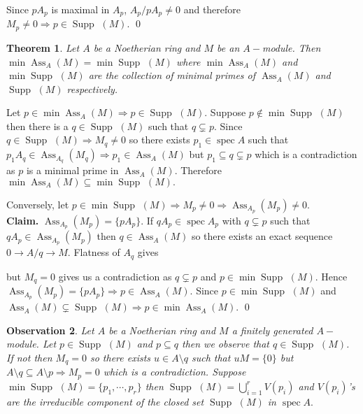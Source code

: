 \documentclass[11pt]{amsart}
\newtheorem{theorem}{Theorem}[section]
\newtheorem{obs}[theorem]{Observation}
\newcommand\isom{\mathrel{\stackon[-0.1ex]{\makebox*{\scalebox{1.08}{\AC}}{=\hfill\llap{=}}}{{\AC}}}}
\newcommand\nvisom{\rotatebox[origin=cc] {-90}{$ \isom $}}
\DeclareMathOperator{\ass}{\text{Ass}}
\DeclareMathOperator{\supp}{\text{Supp~}}
\DeclareMathOperator{\spec}{\text{spec}}
\begin{document}
Since $pA_p$ is maximal in $A_p$, $A_p/pA_p\neq 0$ and therefore $M_p\neq 0 \Rightarrow p\in\supp(M).$ \qed

\begin{theorem}

Let $A$ be a Noetherian ring and $M$ be an $A-$module. Then $\min \ass_A(M)=\min \supp(M)$ where $\min \ass_A(M)$ and $\min\supp(M)$ are the collection of minimal primes of $\ass_A(M)$ and $\supp(M)$ respectively.

\end{theorem}

\proof Let $p\in\min \ass_A(M) \Rightarrow p\in\supp(M).$ Suppose $p\notin \min\supp(M)$ then there is a $q\in \supp(M)$ such that $q\subsetneq p$. Since $q\in\supp(M) \Rightarrow M_q\neq 0$ so there exists $p_1\in \spec A$ such that $p_1A_q\in\ass_{A_q}(M_q) \Rightarrow p_1\in\ass_A(M)$ but $p_1\subseteq q\subsetneq p$ which is a contradiction as $p$ is a minimal prime in $\ass_A(M).$ Therefore $\min\ass_A(M)\subseteq \min\supp(M).$ 

 Conversely, let $p\in\min\supp(M) \Rightarrow M_p\neq 0 \Rightarrow \ass_{A_p}(M_p)\neq 0$.\\
\textbf{Claim.} $\ass_{A_p}(M_p)=\{pA_p\}.$ If $qA_p\in\spec A_p$ with $q\subsetneq p$ such that $qA_p\in\ass_{A_p}(M_p)$ then $q\in \ass_A(M)$ so there exists an exact sequence $0\to A/q\to M.$ Flatness of $A_q$ gives \begin{center}


\end{center}
but $M_q=0$ gives us a contradiction as $q\subsetneq p$ and $p\in\min\supp(M).$ Hence $\ass_{A_p}(M_p)=\{pA_p\} \Rightarrow p\in \ass_A(M).$ Since $p\in\min\supp(M)$ and $\ass_A(M)\subsetneq \supp(M) \Rightarrow p\in\min\ass_A(M).$ \qed

\begin{obs}

Let $A$ be a Noetherian ring and $M$ a finitely generated $A-$module. Let $p\in\supp(M)$ and $p\subseteq q$ then we observe that $q\in\supp(M)$. If not then $M_q=0$ so there exists $u\in A\setminus q$ such that $uM=\{0\}$ but $A\setminus q\subseteq A\setminus p \Rightarrow M_p=0$ which is a contradiction. Suppose $\min \supp(M)=\{p_1,\cdots,p_r\}$ then $\supp(M)=\displaystyle\bigcup_{i=1}^r V(p_i)$ and $V(p_i)$'s are the irreducible component of the closed set $\supp(M)$ in $\spec A.$

\end{obs}
\end{document}
